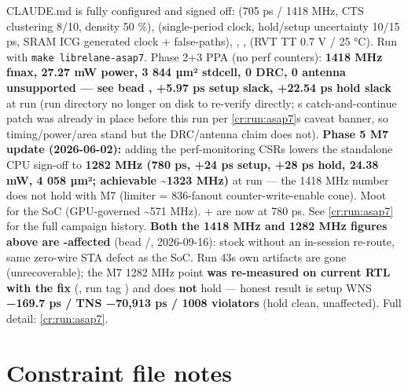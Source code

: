 \begin{relocated}{CLAUDE.md}
 is fully configured and signed off: 
(705 ps / 1418 MHz, CTS clustering 8/10, density 50 \%),
 (single-period clock,
hold/\allowbreak{}setup uncertainty 10/15 ps, SRAM ICG 
generated clock + false-paths), ,
,  (RVT TT 0.7
V / 25 °C). Run with \texttt{make\ librelane-\allowbreak{}asap7}. Phase
2+3 PPA (no perf counters): \textbf{1418 MHz fmax, 27.27 mW power, 3 844
µm² stdcell, 0 DRC, 0 antenna \warn{} unsupported --- see bead
, +5.97 ps setup slack, +22.54 ps hold slack} at run
 (run directory no longer
on disk to re-verify directly; \textquotesingle s
catch-and-continue patch was already in place before this run per
\cref{cr:run:asap7}\textquotesingle s caveat banner, so
timing/\allowbreak{}power/\allowbreak{}area stand but the
DRC/\allowbreak{}antenna claim does not). \textbf{Phase 5 M7 update
(2026-06-02):} adding the perf-monitoring CSRs lowers the standalone CPU
sign-off to \textbf{1282 MHz (780 ps, +24 ps setup, +28 ps hold, 24.38
mW, 4 058 µm²; achievable \textasciitilde1323 MHz)} at run
 --- the 1418 MHz
number does not hold with M7 (limiter = 836-fanout counter-write-enable
cone). Moot for the SoC (GPU-governed \textasciitilde571 MHz).
 +  are now
at 780 ps. See \cref{cr:run:asap7} for the full campaign
history. \warn{} \textbf{Both the 1418 MHz and 1282 MHz figures above
are -affected} (bead /, 2026-09-16): stock
 without an in-session re-route, same
zero-wire STA defect as the SoC. Run 43\textquotesingle s own artifacts
are gone (unrecoverable); the M7 1282 MHz point \textbf{was re-measured
on current RTL with the fix} (, run
tag ) and does \textbf{not} hold --- honest
result is setup WNS \textbf{−169.7 ps / TNS −70,913 ps / 1008 violators}
(hold clean, unaffected). Full detail: \cref{cr:run:asap7}.
\end{relocated}

\chapter{Constraint file notes}\label{tm:ch:pd-constraint-notes}

